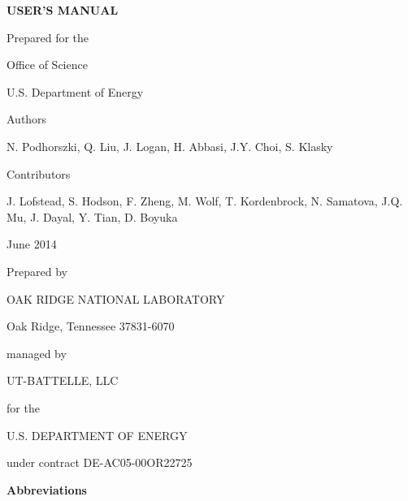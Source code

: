 \begin{center}
{\Large \textbf{\adiosversion USER'S MANUAL}}

\vspace{60pt}
Prepared for the

Office of Science

U.S. Department of Energy

\vspace{60pt}
Authors

\vspace{6pt}
N. Podhorszki, Q. Liu, J. Logan, H. Abbasi, J.Y. Choi, S. Klasky

\vspace{30pt}
Contributors 

\vspace{6pt}
J. Lofstead, S. Hodson, F. Zheng, M. Wolf, T. Kordenbrock, N. Samatova, J.Q. Mu, J. Dayal, Y. Tian, D. Boyuka

\vspace{72pt}
June 2014

\vspace{72pt}
Prepared by

OAK RIDGE NATIONAL LABORATORY

Oak Ridge, Tennessee 37831-6070

managed by

UT-BATTELLE, LLC

for the

U.S. DEPARTMENT OF ENERGY

under contract DE-AC05-00OR22725

\end{center}


\newpage

\tableofcontents


\newpage

\listoffigures


\newpage

\vspace{66pt}
\textbf{Abbreviations}

